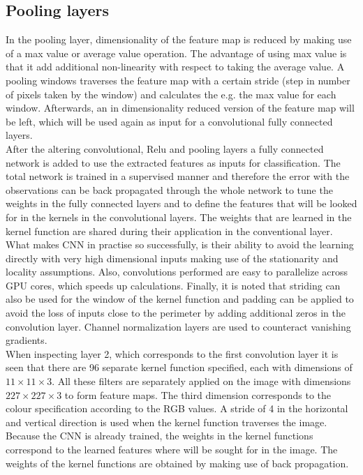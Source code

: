 \documentclass[a4paper,10pt]{article}
\begin{document}
\subsection{Pooling layers}
In the pooling layer, dimensionality of the feature map is reduced by making use of a max value or average value operation. The advantage of using max value is that it add additional non-linearity with respect to taking the average value. A pooling windows traverses the feature map with a certain stride (step in number of pixels taken by the window) and calculates the e.g. the max value for each window. Afterwards, an in dimensionality reduced version of the feature map will be left, which will be used again as input for a convolutional fully connected layers.\\

After the altering convolutional, Relu and pooling layers a fully connected network is added to use the extracted features as inputs for classification. The total network is trained in a supervised manner and therefore the error with the observations can be back propagated through the whole network to tune the weights in the fully connected layers and to define the features that will be looked for in the kernels in the convolutional layers. The weights that are learned in the kernel function are shared during their application in the conventional layer. What makes CNN in practise so successfully, is their ability to avoid the learning directly with very high dimensional inputs making use of the stationarity and locality assumptions. Also, convolutions performed are easy to parallelize across GPU cores, which speeds up calculations. Finally, it is noted that striding can also be used for the window of the kernel function and padding can be applied to avoid the loss of inputs close to the perimeter by adding additional zeros in the convolution layer. Channel normalization layers are used to counteract vanishing gradients.\\


When inspecting layer 2, which corresponds to the first convolution layer it is seen that there are 96 separate kernel function specified, each with dimensions of $ 11 \times 11 \times 3 $. All these filters are separately applied on the image with dimensions $ 227 \times 227 \times 3 $ to form feature maps. The third dimension corresponds to the colour specification according to the RGB values. A stride of 4 in the horizontal and vertical direction is used when the kernel function traverses the image. Because the CNN is already trained, the weights in the kernel functions correspond to the learned features where will be sought for in the image. The weights of the kernel functions are obtained by making use of back propagation.\\
\end{document}

